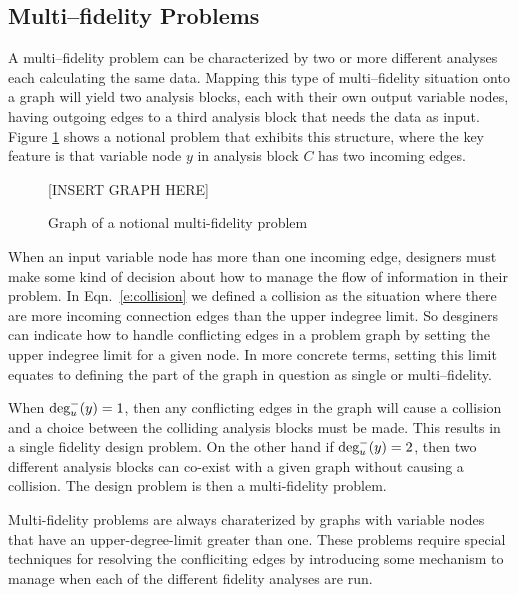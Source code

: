 \subsection{Multi--fidelity Problems}
  
  A multi--fidelity problem can be characterized by two or more different analyses 
  each calculating the same data. Mapping this type of multi--fidelity situation 
  onto a graph will yield two analysis blocks, each with their own output 
  variable nodes, having outgoing edges to a third analysis block that needs the 
  data as input. Figure \ref{f:collision-example} shows a notional problem 
  that exhibits this structure, where the key feature is that variable node $y$ in 
  analysis block $C$ has two incoming edges. 

  \begin{figure}
      \begin{center}
      [INSERT GRAPH HERE]
      \caption{Graph of a notional multi-fidelity problem \label{f:collision-example}}
      \end{center}
  \end{figure}

  When an input variable node has more than one incoming edge, designers must make
  some kind of decision about how to manage the flow of information in their problem. 
  In Eqn.~\ref{e:collision} we defined a collision as the situation where
  there are more incoming connection edges than the upper indegree limit. So desginers can
  indicate how to handle conflicting edges in a problem graph by setting the upper indegree limit
  for a given node. In more concrete terms, setting this limit equates to defining 
  the part of the graph in question as single or multi--fidelity. 

  When $\textrm{deg}_u^-(y)=1$, then any conflicting edges in the graph will cause a collision
  and a choice between the colliding analysis blocks must be made. This results in a 
  single fidelity design problem. On the other hand if $\textrm{deg}_u^-(y)=2$, then two 
  different analysis blocks can co-exist with a given graph without causing a 
  collision. The design problem is then a multi-fidelity problem.

  Multi-fidelity problems are always charaterized by graphs with variable 
  nodes that have an upper-degree-limit greater than one. These problems require 
  special techniques for resolving the confliciting edges by introducing some mechanism
  to manage when each of the different fidelity analyses are 
  run\cite{march2012provably,alexandrov2001approximation,Huang_Allen_Notz_Miller_2006}.

